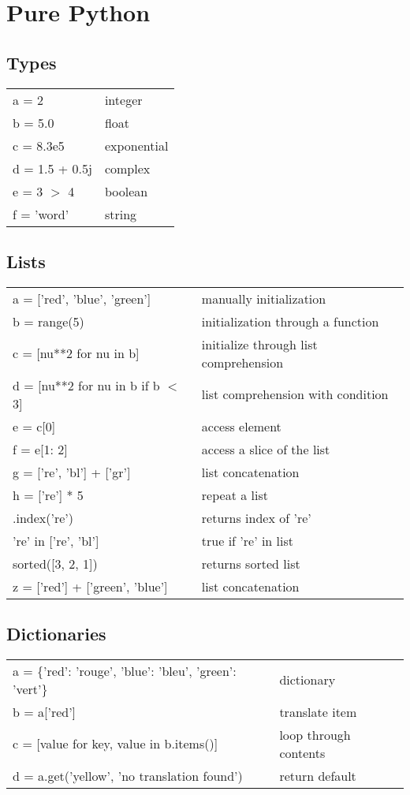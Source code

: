 \documentclass[10pt, a4paper, twocolumn]{article}
\begin{document}
\footnotesize
\section*{Pure Python}
\subsection*{Types}
\begin{tabular}{ p{} p{} }
  a = 2 & integer\\
  b = 5.0 & float\\
  c = 8.3e5 & exponential\\
  d = 1.5 + 0.5j & complex\\
  e = 3 $>$ 4 & boolean\\
  f = 'word' & string\\
\end{tabular}

\subsection*{Lists}
\begin{tabular}{ p{} p{} }
  a = ['red', 'blue', 'green'] & manually initialization\\
  b = range(5) & initialization through a function\\
  c = [nu**2 for nu in b] & initialize through list comprehension\\
  d = [nu**2 for nu in b if b $<$ 3] & list comprehension with condition\\
  e = c[0] & access element\\
  f = e[1: 2] & access a slice of the list\\
  g = ['re', 'bl'] + ['gr'] & list concatenation\\
  h = ['re'] * 5 & repeat a list\\[1pt]
  ['re', 'bl'].index('re') & returns index of 're'\\
  're' in ['re', 'bl'] & true if 're' in list\\
  sorted([3, 2, 1]) & returns sorted list\\
  z = ['red'] + ['green', 'blue'] & list concatenation\\
\end{tabular}

\subsection*{Dictionaries}
\begin{tabular}{ p{} p{} }
  a = \{'red': 'rouge', 'blue': 'bleu', 'green': 'vert'\} & dictionary\\
  b = a['red'] & translate item\\
  c = [value for key, value in b.items()] & loop through contents\\
  d = a.get('yellow', 'no translation found') & return default\\
\end{tabular}
\end{document}
